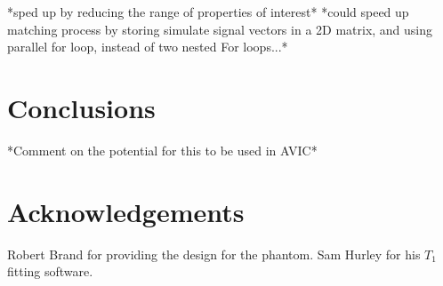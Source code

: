 \documentclass[journal]{IEEEtran}
\begin{document}
*sped up by reducing the range of properties of interest*
*could speed up matching process by storing simulate signal vectors in a 2D matrix, and using parallel for loop, instead of two nested For loops...*
\section{Conclusions}
*Comment on the potential for this to be used in AVIC*
\section{Acknowledgements}
Robert Brand for providing the design for the phantom. Sam Hurley for his $T_1$ fitting software.


\end{document}
